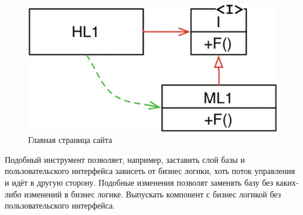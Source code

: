 \begin{figure}[h]
	\centering
	\includegraphics{inc/img/inverted.jpeg}
	\caption{Главная страница сайта}
	\label{img:inverted}
\end{figure}

Подобный инструмент позволяет, например, заставить слой базы и пользовательского интерфейса зависеть от бизнес логики, хоть поток управления и идёт в другую сторону. Подобные изменения позволят заменять базу без каких-либо изменений в бизнес логике. Выпускать компонент с бизнес логикой без пользовательского интерфейса.
